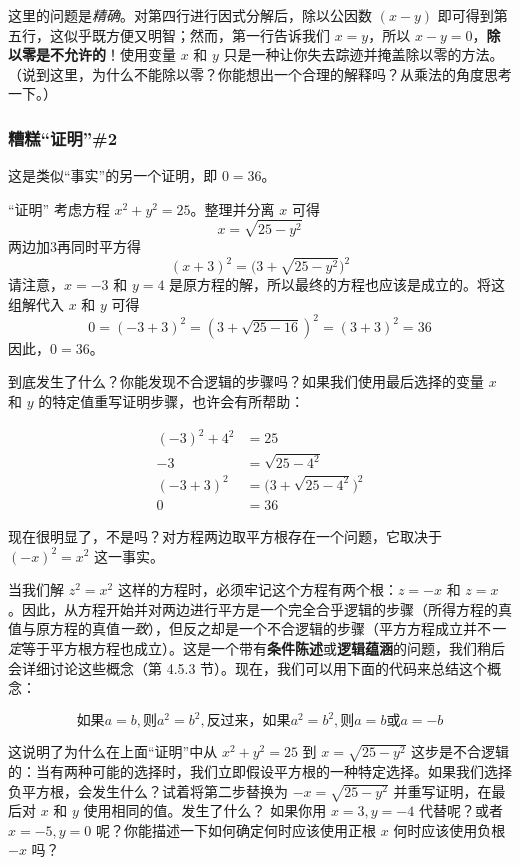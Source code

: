 这里的问题是\emph{精确}。对第四行进行因式分解后，除以公因数 $(x - y)$ 即可得到第五行，这似乎既方便又明智；然而，第一行告诉我们 $x = y$，所以 $x-y = 0$，\textbf{除以零是不允许的}！使用变量 $x$ 和 $y$ 只是一种让你失去踪迹并掩盖除以零的方法。（说到这里，为什么不能除以零？你能想出一个合理的解释吗？从乘法的角度思考一下。）

\subsubsection*{糟糕``证明''\#2}

这是类似``事实''的另一个证明，即 $0 = 36$。

\begin{proofs}{``证明''}
    考虑方程 $x^2+y^2 = 25$。整理并分离 $x$ 可得
    \[x = \sqrt{25-y^2}\]
    两边加3再同时平方得
    \[(x+3)^2=\Big(3+\sqrt{25-y^2}\Big)^2\]
    请注意，$x = -3$ 和 $y = 4$ 是原方程的解，所以最终的方程也应该是成立的。将这组解代入 $x$ 和 $y$ 可得
    \[0 = (-3+3)^2 = (3+\sqrt{25-16})^2 = (3+3)^2 = 36\]
    因此，$0 = 36$。
\end{proofs}

到底发生了什么？你能发现不合逻辑的步骤吗？如果我们使用最后选择的变量 $x$ 和 $y$ 的特定值重写证明步骤，也许会有所帮助：

\begin{align*}
    (-3)^2+4^2 &= 25 \\
    -3 &= \sqrt{25-4^2} \\
    (-3+3)^2 &= \Big(3+\sqrt{25-4^2}\Big)^2 \\
    0 &= 36
\end{align*}

现在很明显了，不是吗？对方程两边取平方根存在一个问题，它取决于 $(-x)^2=x^2$ 这一事实。

当我们解 $z^2=x^2$ 这样的方程时，必须牢记这个方程有两个根：$z = -x$ 和 $z = x$。因此，从方程开始并对两边进行平方是一个完全合乎逻辑的步骤（所得方程的真值与原方程的真值\emph{一致}），但反之却是一个不合逻辑的步骤（平方方程成立并不\emph{一定}等于平方根方程也成立）。这是一个带有\textbf{条件陈述}或\textbf{逻辑蕴涵}的问题，我们稍后会详细讨论这些概念（第 4.5.3 节）。现在，我们可以用下面的代码来总结这个概念：

\[\text{如果} a=b, \text{则} a^2=b^2, \text{反过来，如果} a^2=b^2, \text{则} a=b \text{或} a=-b\]

这说明了为什么在上面``证明''中从 $x^2+y^2 = 25$ 到 $x = \sqrt{25-y^2}$ 这步是不合逻辑的：当有两种可能的选择时，我们立即假设平方根的一种特定选择。如果我们选择负平方根，会发生什么？试着将第二步替换为 $-x = \sqrt{25-y^2}$ 并重写证明，在最后对 $x$ 和 $y$ 使用相同的值。发生了什么？ 如果你用 $x = 3, y = -4$ 代替呢？或者 $x=-5, y=0$ 呢？你能描述一下如何确定何时应该使用正根 $x$ 何时应该使用负根 $-x$ 吗？

